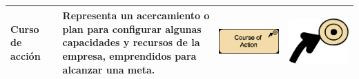 \begin{longtable}{|p{0.15\linewidth}|p{0.45\linewidth}|p{0.2\linewidth} p{0.2\linewidth}|}
    Curso de acción 
    &
    Representa un acercamiento o plan para configurar algunas capacidades y recursos de la empresa, emprendidos para alcanzar una meta.
    &
\begin{center}
    \includegraphics[width=1\linewidth]{imgs/capa_estrategia/fig-Course-of-Action-Notation_1.pdf}
\end{center} &
\begin{center}
    \includegraphics[width=0.5\linewidth]{imgs/capa_estrategia/fig-Course-of-Action-Notation_2.pdf}
\end{center}
    \\ \hline


\end{longtable}